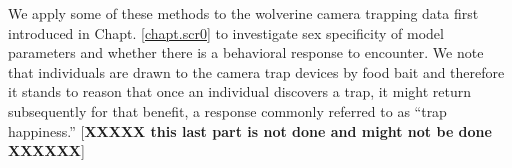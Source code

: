 We apply some of these methods to the wolverine camera trapping
data first introduced in Chapt. \ref{chapt.scr0}
to investigate sex specificity of model parameters and whether
there is a behavioral response to encounter. We note that individuals
are drawn to the camera trap devices by food bait and therefore it
stands to reason that once an individual discovers a trap, it might
return subsequently for that benefit, a response commonly referred to
as ``trap happiness.''
[{\bf XXXXX this last part is not done and might not be done XXXXXX}]


\begin{comment}
A basic problem with these two objectives of model selection and model
assessment is their simultaneous use implies a kind of contradiction
which we call the {\it model selectors paradox}: Inferences are always
achieved using standard paradigms of parametric inference (Bayesian or
frequentist) which asssert that the model is properly specified. That
is, we assume that the model is truth. This is paradoxical because we
all know that ``all models are wrong'' but, possibly, ``some are
useful.'' In fact, the notion that an ``assumption'' could even be
correct is itself something of an oxymoron.
\end{comment}
\begin{comment}
XXX I love this quote -- would be nice to use it somewhere: XXXX
  Therefore we don't expect
or hope to make assumptions that are ``correct'' in any way. Gelman
and Shalizi (2010) say it this way: ``there is general agreement that,
in this domain, all models in use are wrong -- not just merely
falsifiable, but actually false.''  We should therefore refrain from
over-stating the relevance of any model.  [not sure where I was going
with this point]
\end{comment}




\begin{comment}
A few specific questions to resolve:
\begin{itemize}
\item[(1)]  Can AIC or DIC choose among detection models and does it matter?
\item[(2)]  Can AIC or DIC choose among more substantial models?  We should
 assume it does. Can we rig up a test?  Suggest: (1) trap level
 covariate and trying DIC; (2) Model Mb vs. not
\item[(3)] Simultaneous to above, see if we can do that.......
Posterior model probabilities: Can we demo this?   With detection models?
 Don't do much analysis of the situation, just demo it maybe?
\item[(4)]  Basic framework for Bayesian GoF. Power under alternatives.
(clustering, regularity, uniformity) and misspecified encounter models
-- do they show a lack of fit?
\end{itemize}
\end{comment}



